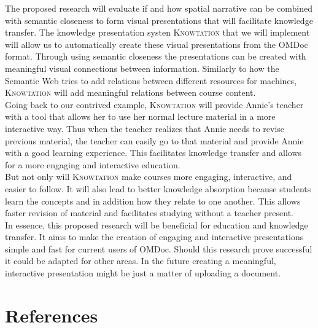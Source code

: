 \documentclass[twoside, 12pt]{article}
\newcommand{\sys}{\textsc{Knowtation}\xspace}
\begin{document}
The proposed research will evaluate if and how spatial narrative can be combined with semantic closeness to form visual presentations that will facilitate knowledge transfer. The knowledge presentation systen \sys that we will implement will allow us to automatically create these visual presentations from the OMDoc format. Through using semantic closeness the presentations can be created with meaningful visual connections between information. Similarly to how the Semantic Web tries to add relations between different resources for machines, \sys will add meaningful relations between course content.\\

Going back to our contrived example, \sys will provide Annie's teacher with a tool that allows her to use her normal lecture material in a more interactive way. Thus when the teacher realizes that Annie needs to revise previous material, the teacher can easily go to that material and provide Annie with a good learning experience. This facilitates knowledge transfer and allows for a more engaging and interactive education.\\

But not only will \sys make courses more engaging, interactive, and easier to follow. It will also lead to better knowledge absorption because students learn the concepts and in addition how they relate to one another. This allows faster revision of material and facilitates studying without a teacher present. \\

In essence, this proposed research will be beneficial for education and knowledge transfer. It aims to make the creation of engaging and interactive presentations simple and fast for current users of OMDoc. Should this research prove successful it could be adapted for other areas. In the future creating a meaningful, interactive presentation might be just a matter of uploading a document.

\newpage
\section{References}

{}

\end{document}
